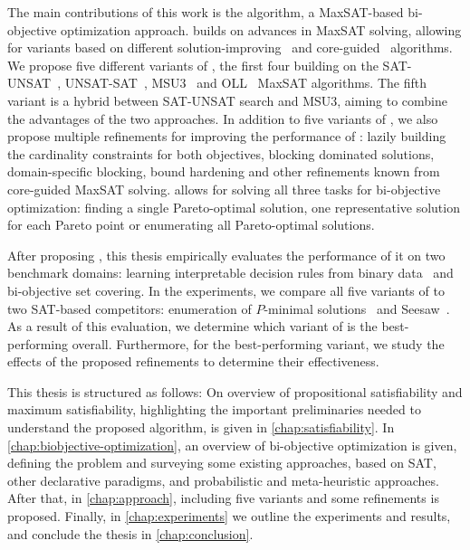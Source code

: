 The main contributions of this work is the \algname{} algorithm, a MaxSAT-based bi-objective optimization approach.
\algname{} builds on advances in MaxSAT solving, allowing for variants based on different solution-improving~\autocites{handbook2-maxsat,DBLP:journals/jsat/BerreP10,DBLP:journals/jsat/EenS06} and core-guided~\autocites{DBLP:journals/corr/abs-0712-1097,DBLP:conf/sat/AnsoteguiBL09,DBLP:conf/cp/MorgadoDM14,DBLP:journals/jsat/IgnatievMM19} algorithms.
We propose five different variants of \algname{}, the first four building on the SAT-UNSAT~\autocite{DBLP:journals/jsat/BerreP10}, UNSAT-SAT~\autocite{DBLP:conf/sat/FuM06}, MSU3~\autocite{DBLP:journals/corr/abs-0712-1097} and OLL~\autocite{DBLP:conf/cp/MorgadoDM14} MaxSAT algorithms.
The fifth variant is a hybrid between SAT-UNSAT search and MSU3, aiming to combine the advantages of the two approaches.
In addition to five variants of \algname{}, we also propose multiple refinements for improving the performance of \algname{}:
lazily building the cardinality constraints for both objectives, blocking dominated solutions, domain-specific blocking, bound hardening and other refinements known from core-guided MaxSAT solving.
\algname{} allows for solving all three tasks for bi-objective optimization:
finding a single Pareto-optimal solution, one representative solution for each Pareto point or enumerating all Pareto-optimal solutions.

After proposing \algname{}, this thesis empirically evaluates the performance of it on two benchmark domains:
learning interpretable decision rules from binary data~\autocite{DBLP:conf/cp/MaliotovM18} and bi-objective set covering.
In the experiments, we compare all five variants of \algname{} to two SAT-based competitors:
enumeration of $P$-minimal solutions~\autocite{DBLP:conf/cp/SohBTB17} and Seesaw~\autocite{DBLP:conf/cp/JanotaMSM21}.
As a result of this evaluation, we determine which variant of \algname{} is the best-performing overall.
Furthermore, for the best-performing variant, we study the effects of the proposed refinements to determine their effectiveness.

This thesis is structured as follows:
On overview of propositional satisfiability and maximum satisfiability, highlighting the important preliminaries needed to understand the proposed algorithm, is given in \cref{chap:satisfiability}.
In \cref{chap:biobjective-optimization}, an overview of bi-objective optimization is given, defining the problem and surveying some existing approaches, based on SAT, other declarative paradigms, and probabilistic and meta-heuristic approaches.
After that, in \cref{chap:approach}, \algname{} including five variants and some refinements is proposed.
Finally, in \cref{chap:experiments} we outline the experiments and results, and conclude the thesis in \cref{chap:conclusion}.